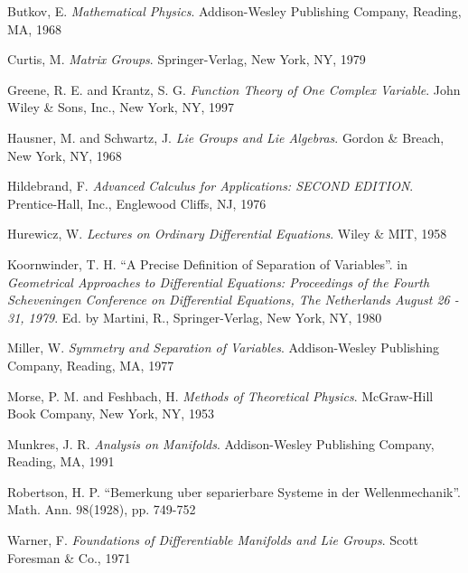 \begin{thebibliography}{Hausner and Schwartz 1968}

 Butkov, E. \textsl{Mathematical Physics}. Addison-Wesley Publishing Company, Reading, MA, 1968

 Curtis, M. \textsl{Matrix Groups}. Springer-Verlag, New York, NY, 1979

 Greene, R. E. and Krantz, S. G. \textsl{Function Theory of One Complex Variable}. John Wiley \& Sons, Inc., New York, NY, 1997

 Hausner, M. and Schwartz, J. \textsl{Lie Groups and Lie Algebras}. Gordon \& Breach, New York, NY, 1968

 Hildebrand, F. \textsl{Advanced Calculus for Applications: \footnotesize{SECOND EDITION}}. Prentice-Hall, Inc., Englewood Cliffs, NJ, 1976

 Hurewicz, W. \textsl{Lectures on Ordinary Differential Equations}. Wiley \& MIT, 1958

 Koornwinder, T. H. ``A Precise Definition of Separation of Variables''. in \textsl{Geometrical Approaches to Differential Equations: Proceedings of the Fourth Scheveningen Conference on Differential Equations, The Netherlands August 26 - 31, 1979}. Ed. by Martini, R., Springer-Verlag, New York, NY, 1980

 Miller, W. \textsl{Symmetry and Separation of Variables}. Addison-Wesley Publishing Company, Reading, MA, 1977

 Morse, P. M. and Feshbach, H. \textsl{Methods of Theoretical Physics}. McGraw-Hill Book Company, New York, NY, 1953

 Munkres, J. R. \textsl{Analysis on Manifolds}. Addison-Wesley Publishing Company, Reading, MA, 1991

 Robertson, H. P. ``Bemerkung uber separierbare Systeme in der Wellenmechanik''. Math. Ann. 98(1928), pp. 749-752

 Warner, F. \textsl{Foundations of Differentiable Manifolds and Lie Groups}. Scott Foresman \& Co., 1971

\end{thebibliography}